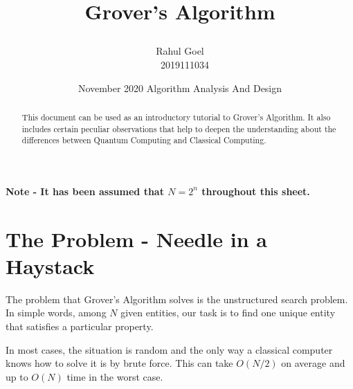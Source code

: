 \documentclass[a4paper]{article}
\begin{document}
	\title{

	\vspace{1cm}
	\Huge Grover's Algorithm
	}

	\vspace{1cm}


	\author{\Large {Rahul Goel} \Large \\  \ \ 2019111034
	\date{November 2020}
	\vspace{0.5cm}}

	\date{
	\large Algorithm Analysis And Design \\
	\vspace{1cm}
	}

	\maketitle
	\setlength{\parindent}{0pt}

\vspace{8cm}
\begin{abstract}
\begin{center}
\normalsize
This document can be used as an introductory tutorial to Grover's Algorithm. It also includes certain peculiar observations that help to deepen the understanding about the differences between Quantum Computing and Classical Computing.
\end{center}
\end{abstract}
	\newpage
	\tableofcontents
	\newpage



\maketitle

\textbf{Note - It has been assumed that $N = 2 ^ n$ throughout this sheet.}

\section{The Problem - Needle in a Haystack}
\indent The problem that Grover's Algorithm solves is the unstructured search problem. In simple words, among $N$ given entities, our task is to find one unique entity that satisfies a particular property.

In most cases, the situation is random and the only way a classical computer knows how to solve it is by brute force. This can take $O(N / 2)$ on average and up to $O(N)$ time in the worst case.
\end{document}
